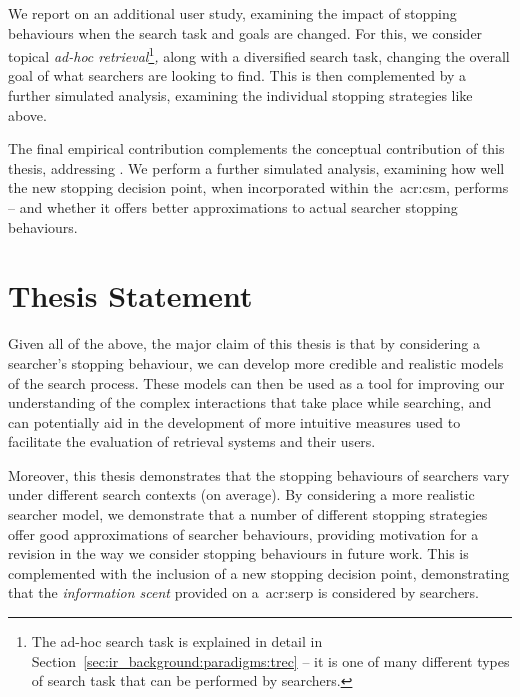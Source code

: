 \noindent
{} We report on an additional user study, examining the impact of stopping behaviours when the search task and goals are changed. For this, we consider topical \emph{ad-hoc retrieval}\footnote{The ad-hoc search task is explained in detail in Section~\ref{sec:ir_background:paradigms:trec} -- it is one of many different types of search task that can be performed by searchers.}\emph{,} along with a diversified search task, changing the overall goal of what searchers are looking to find. This is then complemented by a further simulated analysis, examining the individual stopping strategies like above.

 The final empirical contribution complements the conceptual contribution of this thesis, addressing . We perform a further simulated analysis, examining how well the new stopping decision point, when incorporated within the~\gls{acr:csm}, performs -- and whether it offers better approximations to actual searcher stopping behaviours.

\section{Thesis Statement}
Given all of the above, the major claim of this thesis is that by considering a searcher's stopping behaviour, we can develop more credible and realistic models of the search process. These models can then be used as a tool for improving our understanding of the complex interactions that take place while searching, and can potentially aid in the development of more intuitive measures used to facilitate the evaluation of retrieval systems and their users.

Moreover, this thesis demonstrates that the stopping behaviours of searchers vary under different search contexts (on average). By considering a more realistic searcher model, we demonstrate that a number of different stopping strategies offer good approximations of searcher behaviours, providing motivation for a revision in the way we consider stopping behaviours in future work. This is complemented with the inclusion of a new stopping decision point, demonstrating that the \emph{information scent} provided on a~\gls{acr:serp} is considered by searchers.

%


